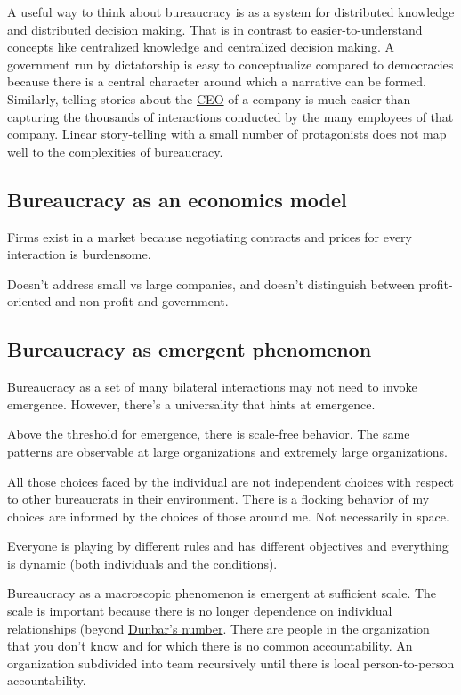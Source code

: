 A useful way to think about bureaucracy is as a system for distributed knowledge and distributed decision making. That is in contrast to easier-to-understand concepts like centralized knowledge and centralized decision making. A government run by dictatorship is easy to conceptualize compared to democracies because there is a central character around which a narrative can be formed. Similarly, telling stories about the \href{https://en.wikipedia.org/wiki/Chief_executive_officer}{CEO} of a company is much easier than capturing the thousands of interactions conducted by the many employees of that company. Linear story-telling with a small number of protagonists does not map well to the complexities of bureaucracy. 


\subsection{Bureaucracy as an economics model}
Firms exist in a market because negotiating contracts and prices for every interaction is burdensome. 

Doesn't address small vs large companies, and doesn't distinguish between profit-oriented and non-profit and government. 

\subsection{Bureaucracy as emergent phenomenon}
Bureaucracy as a set of many bilateral interactions may not need to invoke emergence. However, there's a universality that hints at emergence. 

Above the threshold for emergence, there is scale-free behavior. The same patterns are observable at large organizations and extremely large organizations.

All those choices faced by the individual are not independent choices with respect to other bureaucrats in their environment. There is a flocking behavior of my choices are informed by the choices of those around me. Not necessarily in space.

Everyone is playing by different rules and has different objectives and everything is dynamic (both individuals and the conditions). 

Bureaucracy as a macroscopic phenomenon is emergent at sufficient scale. The scale is important because there is no longer dependence on individual relationships (beyond \href{https://en.wikipedia.org/wiki/Dunbar\%27s_number}{Dunbar's number}. There are people in the organization that you don't know and for which there is no common accountability. An organization subdivided into team recursively until there is local person-to-person accountability.  

